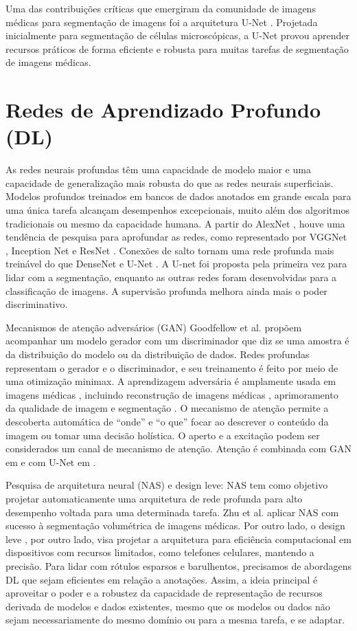 \documentclass[
	12pt,				%
	openany,oneside,
	a4paper,			%
	english,			%
	brazil,				%
	]{abntex2}
\begin{document}
Uma das contribuições críticas que emergiram da comunidade de imagens médicas para segmentação de imagens foi a arquitetura U-Net \cite{c9}. Projetada inicialmente para segmentação de células microscópicas, a U-Net provou aprender recursos práticos de forma eficiente e robusta para muitas tarefas de segmentação de imagens médicas.

\section{Redes de Aprendizado Profundo (DL)}
As redes neurais profundas têm uma capacidade de modelo maior e uma capacidade de generalização mais robusta do que as redes neurais superficiais. Modelos profundos treinados em bancos de dados anotados em grande escala para uma única tarefa alcançam desempenhos excepcionais, muito além dos algoritmos tradicionais ou mesmo da capacidade humana. A partir do AlexNet \cite{c4}, houve uma tendência de pesquisa para aprofundar as redes, como representado por VGGNet \cite{c10}, Inception Net \cite{c11} e ResNet \cite{c12}. Conexões de salto tornam uma rede profunda mais treinável do que DenseNet \cite{c13} e U-Net \cite{c9}. A U-net foi proposta pela primeira vez para lidar com a segmentação, enquanto as outras redes foram desenvolvidas para a classificação de imagens. A supervisão profunda \cite{c14} melhora ainda mais o poder discriminativo.

Mecanismos de atenção adversários (GAN) Goodfellow et al. \cite{c15} propõem acompanhar um modelo gerador com um discriminador que diz se uma amostra é da distribuição do modelo ou da distribuição de dados. Redes profundas representam o gerador e o discriminador, e seu treinamento é feito por meio de uma otimização minimax. A aprendizagem adversária é amplamente usada em imagens médicas \cite{c16}, incluindo reconstrução de imagens médicas \cite{c17}, aprimoramento da qualidade de imagem \cite{c18} e segmentação \cite{c19}. O mecanismo de atenção \cite{c20} permite a descoberta automática de “onde” e “o que” focar ao descrever o conteúdo da imagem ou tomar uma decisão holística. O aperto e a excitação \cite{c21} podem ser considerados um canal de mecanismo de atenção. Atenção é combinada com GAN em \cite{c22} e com U-Net em \cite{c23}.

Pesquisa de arquitetura neural (NAS) e design leve: NAS \cite{c24} tem como objetivo projetar automaticamente uma arquitetura de rede profunda para alto desempenho voltada para uma determinada tarefa. Zhu et al. \cite{c25} aplicar NAS com sucesso à segmentação volumétrica de imagens médicas. Por outro lado, o design leve \cite{c26, c27}, por outro lado, visa projetar a arquitetura para eficiência computacional em dispositivos com recursos limitados, como telefones celulares, mantendo a precisão. Para lidar com rótulos esparsos e barulhentos, precisamos de abordagens DL que sejam eficientes em relação a anotações. Assim, a ideia principal é aproveitar o poder e a robustez da capacidade de representação de recursos derivada de modelos e dados existentes, mesmo que os modelos ou dados não sejam necessariamente do mesmo domínio ou para a mesma tarefa, e se adaptar.
\end{document}
